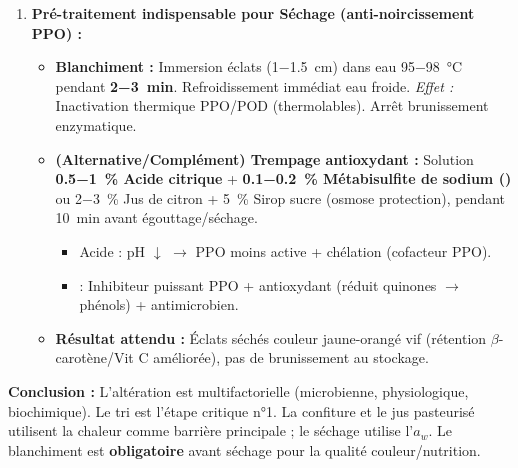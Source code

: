 \documentclass[11pt]{article}
\begin{document}
\begin{exoresolu}
\begin{enumerate}
\begin{enumerate}
\begin{itemize}
                        \item \emph{Justification :} \textbf{Pasteurisation} (\SI{90-95}{\celsius}, \SI{15-30}{s}) détruit formes végétatives + inactivation PPO. \textbf{Acidification} (pH < 4,0 jus citron) + \textbf{Remplissage à chaud} + \textbf{Capsulage} $\rightarrow$ Vide + Anaérobiose. Conservation 6-12 mois ambiant.
                        \item \emph{Avantage :} Processus rapide (flux tendu), valorise gros volumes, produit prêt à boire.
                    \end{itemize}
            \end{enumerate}
        \item \textbf{Pré-traitement indispensable pour Séchage (anti-noircissement PPO) :}
            \begin{itemize}
                \item \textbf{Blanchiment :} Immersion éclats (\SI{1-1,5}{cm}) dans eau \SI{95-98}{\celsius} pendant \textbf{\SI{2-3}{min}}. Refroidissement immédiat eau froide. \emph{Effet :} Inactivation thermique PPO/POD (thermolables). Arrêt brunissement enzymatique.
                \item \textbf{(Alternative/Complément) Trempage antioxydant :} Solution \textbf{\SI{0,5-1}{\%} Acide citrique} + \textbf{\SI{0,1-0,2}{\%} Métabisulfite de sodium ()} ou \SI{2-3}{\%} Jus de citron + \SI{5}{\%} Sirop sucre (osmose protection), pendant \SI{10}{min} avant égouttage/séchage.
                    \begin{itemize}
                        \item Acide : pH $\downarrow$ $\rightarrow$ PPO moins active + chélation  (cofacteur PPO).
                        \item {} : Inhibiteur puissant PPO + antioxydant (réduit quinones $\rightarrow$ phénols) + antimicrobien.
                    \end{itemize}
                \item \textbf{Résultat attendu :} Éclats séchés couleur jaune-orangé vif (rétention $\beta$-carotène/Vit C améliorée), pas de brunissement au stockage.
            \end{itemize}
    \end{enumerate}
    \textbf{Conclusion :} L'altération est multifactorielle (microbienne, physiologique, biochimique). Le tri est l'étape critique n°1. La confiture et le jus pasteurisé utilisent la chaleur comme barrière principale ; le séchage utilise l'$a_w$. Le blanchiment est \textbf{obligatoire} avant séchage pour la qualité couleur/nutrition.
\end{exoresolu}
\end{document}
